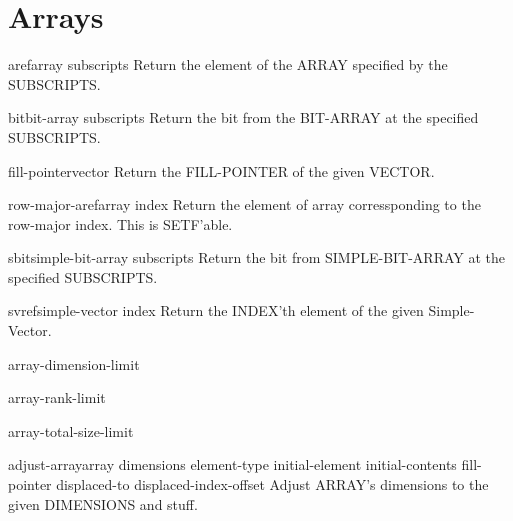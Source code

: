 \chapter{Arrays}

\begin{accessor}{aref}{array \rest subscripts}{}{}
  Return the element of the ARRAY specified by the SUBSCRIPTS.
\end{accessor}

\begin{accessor}{bit}{bit-array \rest subscripts}{}{}
  Return the bit from the BIT-ARRAY at the specified SUBSCRIPTS.
\end{accessor}

\begin{accessor}{fill-pointer}{vector}{}{}
  Return the FILL-POINTER of the given VECTOR.
\end{accessor}

\begin{accessor}{row-major-aref}{array index}{}{}
  Return the element of array corressponding to the row-major index. This is
   SETF'able.
\end{accessor}

\begin{accessor}{sbit}{simple-bit-array \rest subscripts}{}{}
  Return the bit from SIMPLE-BIT-ARRAY at the specified SUBSCRIPTS.
\end{accessor}

\begin{accessor}{svref}{simple-vector index}{}{}
  Return the INDEX'th element of the given Simple-Vector.
\end{accessor}

\begin{constant}{array-dimension-limit}{}{}{}
  
\end{constant}

\begin{constant}{array-rank-limit}{}{}{}
  
\end{constant}

\begin{constant}{array-total-size-limit}{}{}{}
  
\end{constant}

\begin{function}{adjust-array}{array dimensions \key element-type initial-element initial-contents
 fill-pointer displaced-to displaced-index-offset}{}{}
  Adjust ARRAY's dimensions to the given DIMENSIONS and stuff.
\end{function}

